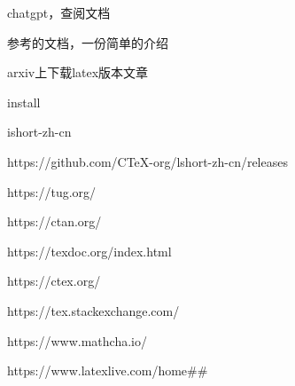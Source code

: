 \documentclass[11pt]{ctexart}
\begin{document}
 chatgpt，查阅文档

参考的文档，一份简单的介绍

arxiv上下载latex版本文章

install







ishort-zh-cn

https://github.com/CTeX-org/lshort-zh-cn/releases



https://tug.org/

https://ctan.org/

https://texdoc.org/index.html

https://ctex.org/

https://tex.stackexchange.com/

https://www.mathcha.io/

https://www.latexlive.com/home\#\#
\end{document}

